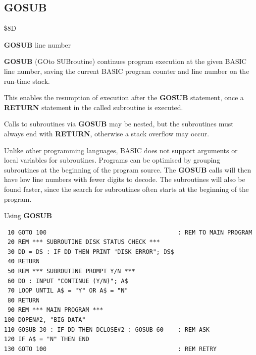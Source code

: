 \subsection{GOSUB}
\begin{description}[leftmargin=2cm,style=nextline]
\item [Token:]    \$8D

\item [Format:]   {\bf GOSUB} line number

\item [Usage:]    {\bf GOSUB} (GOto SUBroutine) continues program execution at the given BASIC line number, saving the current BASIC program counter and line number on the run-time stack.

                  This enables the resumption of execution after the {\bf GOSUB} statement, once a {\bf RETURN} statement in the called subroutine is executed.

                  Calls to subroutines via {\bf GOSUB} may be nested, but the subroutines must always end with {\bf RETURN}, otherwise a stack overflow may occur.

\item [Remarks:]  Unlike other programming languages, BASIC does not support arguments or local variables for subroutines. Programs can be optimised by grouping subroutines at the beginning of the program source. The {\bf GOSUB} calls will then have low line numbers with fewer digits to decode. The subroutines will also be found faster, since the search for subroutines often starts at the beginning of the program.

\item [Example:]  Using {\bf GOSUB}

\begin{tcolorbox}[colback=black,coltext=white]
\verbatimfont{\codefont}
\begin{verbatim}
 10 GOTO 100                                     : REM TO MAIN PROGRAM
 20 REM *** SUBROUTINE DISK STATUS CHECK ***
 30 DD = DS : IF DD THEN PRINT "DISK ERROR"; DS$
 40 RETURN
 50 REM *** SUBROUTINE PROMPT Y/N ***
 60 DO : INPUT "CONTINUE (Y/N)"; A$
 70 LOOP UNTIL A$ = "Y" OR A$ = "N"
 80 RETURN
 90 REM *** MAIN PROGRAM ***
100 DOPEN#2, "BIG DATA"
110 GOSUB 30 : IF DD THEN DCLOSE#2 : GOSUB 60    : REM ASK
120 IF A$ = "N" THEN END
130 GOTO 100                                     : REM RETRY
\end{verbatim}
\end{tcolorbox}
\end{description}

